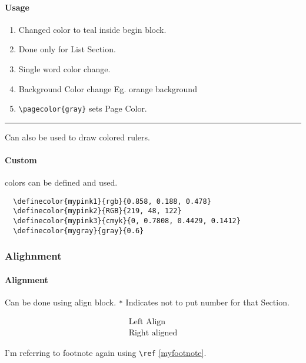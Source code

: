 \documentclass{report}[a4paper,12pt] %
\begin{document}
\paragraph{Usage}
\begin{enumerate}
  \color{teal}
  \item Changed color to teal inside begin block.
  \item Done only for List Section.
  \item Single \textcolor{Sepia}{word} color change.
  \item Background Color change Eg. \colorbox{BurntOrange}{orange background}
  \item \verb|\pagecolor{gray}| sets Page Color.
\end{enumerate}

{\color{RubineRed} \rule{\linewidth}{0.5mm}}
Can also be used to draw colored rulers. 

\paragraph{Custom} colors can be defined and \textcolor{mypink2}{used}.

\begin{verbatim}
  \definecolor{mypink1}{rgb}{0.858, 0.188, 0.478}
  \definecolor{mypink2}{RGB}{219, 48, 122}
  \definecolor{mypink3}{cmyk}{0, 0.7808, 0.4429, 0.1412}
  \definecolor{mygray}{gray}{0.6}
\end{verbatim}

\subsubsection{Alighnment}
\paragraph{Alignment} Can be done using align block. 
\verb|*| Indicates not to put number for that Section.

\begin{align*}
  \text{Left Align}\\
  \text{Right aligned}
\end{align*}

I'm referring to footnote again using \verb|\ref| \ref{myfootnote}.
\end{document}
